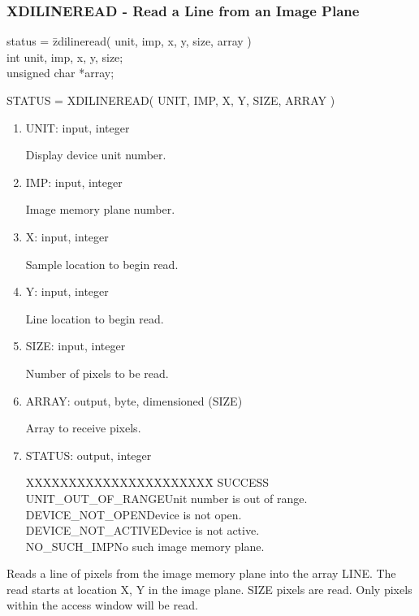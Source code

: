 \subsubsection{XDILINEREAD - Read a Line from an Image Plane}
\begin{tabbing}
status = \=zdilineread( unit, imp, x, y, size, array )\\
\>int  unit, imp, x, y, size;\\
\>unsigned char  *array;\\
\end{tabbing}
STATUS = XDILINEREAD( UNIT, IMP, X, Y, SIZE, ARRAY )
\begin{enumerate}
\item UNIT:  input, integer

Display device unit number.
\item IMP:  input, integer

Image memory plane number.
\item X:  input, integer

Sample location to begin read.
\item Y:  input, integer

Line location to begin read.
\item SIZE:  input, integer

Number of pixels to be read.
\item ARRAY:  output, byte, dimensioned (SIZE)

Array to receive pixels.
\item STATUS:  output, integer
\begin{tabbing}
XXXXXXXXXXXXXXXXXXXXXX\=\kill
SUCCESS\\
UNIT\_OUT\_OF\_RANGE\>Unit number is out of range.\\
DEVICE\_NOT\_OPEN\>Device is not open.\\
DEVICE\_NOT\_ACTIVE\>Device is not active.\\
NO\_SUCH\_IMP\>No such image memory plane.\\
\end{tabbing}
\end{enumerate}
Reads a line of pixels from the image memory plane into the array
LINE.  The read starts at location X, Y in the image plane.  SIZE
pixels are read.  Only pixels within the access window will be read.
\newpage
